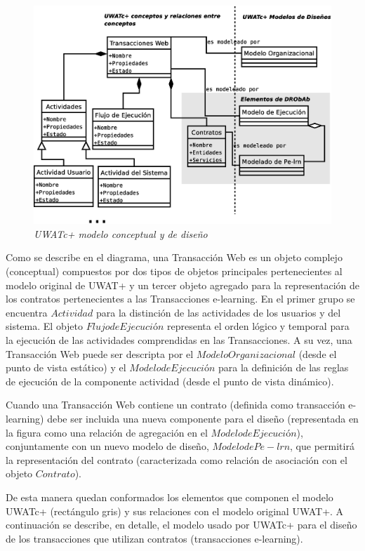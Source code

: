 	\begin{figure}[!h]
        \begin{center}
	\includegraphics[width=5 in,totalheight=3 in]{drobab.eps}
	\caption{\small \sl UWATc+ modelo conceptual y de diseño} \label{drobab}
         \end{center}
         \end{figure}


Como se describe en el diagrama, una Transacción Web es un objeto complejo
(conceptual) compuestos por dos tipos de objetos principales pertenecientes al
modelo original de UWAT+ y un tercer objeto  agregado para la representación de
los contratos pertenecientes a las Transacciones e-learning. En el primer grupo
se encuentra $Actividad$ para la distinción de las actividades de los usuarios y
del sistema. El objeto $Flujo de Ejecución$ representa el orden lógico y
temporal para la ejecución de las actividades comprendidas en las Transacciones.
A su vez, una Transacción Web puede ser descripta por el $Modelo Organizacional$
(desde el punto de vista estático) y el $Modelo de Ejecución$ para la definición
de las reglas de ejecución de la componente actividad (desde el punto de vista
dinámico). 

Cuando una Transacción Web contiene un contrato (definida como transacción
e-learning) debe ser incluida una nueva componente para el diseño (representada
en la figura como una relación de agregación en el $Modelo de Ejecución$),
conjuntamente con un nuevo modelo de diseño, $Modelo de Pe-lrn$, que permitirá
la representación del contrato (caracterizada como relación de asociación con el
objeto $Contrato$).

De esta manera quedan conformados los elementos que componen el modelo UWATc+
(rectángulo gris) y sus relaciones con el modelo original UWAT+. A continuación
se describe, en detalle, el modelo usado por UWATc+ para el diseño de los
transacciones que utilizan contratos (transacciones e-learning). 


